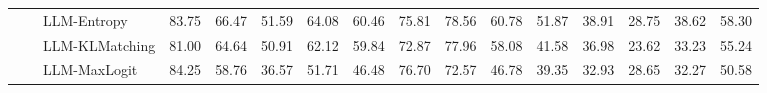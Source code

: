 \begin{table}[ht!]
\begin{tabularx}{\textwidth}{@{}l l l |l *{11}{Y}|Y@{}}
 &  & LLM-Entropy & 83.75 & 66.47 & 51.59 & 64.08 & 60.46 & 75.81 & 78.56 & 60.78 & 51.87 & 38.91 & 28.75 & 38.62 & 58.30 \\
 &  & LLM-KLMatching & 81.00 & 64.64 & 50.91 & 62.12 & 59.84 & 72.87 & 77.96 & 58.08 & 41.58 & 36.98 & 23.62 & 33.23 & 55.24 \\
 &  & LLM-MaxLogit & 84.25 & 58.76 & 36.57 & 51.71 & 46.48 & 76.70 & 72.57 & 46.78 & 39.35 & 32.93 & 28.65 & 32.27 & 50.58 \\
\bottomrule
\end{tabularx}
\label{table::openset_LCR0.1}
\end{table}